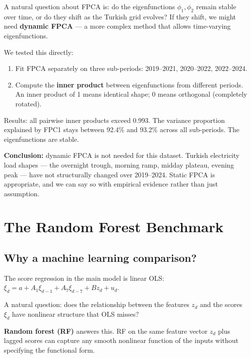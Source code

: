 \documentclass[11pt,a4paper]{article}
\begin{document}
A natural question about FPCA is: do the eigenfunctions $\phi_1, \phi_2$
remain stable over time, or do they shift as the Turkish grid evolves?
If they shift, we might need \textbf{dynamic FPCA} --- a more complex
method that allows time-varying eigenfunctions.

We tested this directly:

\begin{enumerate}[nosep]
  \item Fit FPCA separately on three sub-periods: 2019--2021, 2020--2022, 2022--2024.
  \item Compute the \textbf{inner product} between eigenfunctions from
    different periods. An inner product of 1 means identical shape;
    0 means orthogonal (completely rotated).
\end{enumerate}

Results: all pairwise inner products exceed 0.993. The variance
proportion explained by FPC1 stays between 92.4\% and 93.2\%
across all sub-periods. The eigenfunctions are stable.

\begin{resultbox}
\textbf{Conclusion:} dynamic FPCA is not needed for this dataset.
Turkish electricity load shapes --- the overnight trough, morning
ramp, midday plateau, evening peak --- have not structurally changed
over 2019--2024. Static FPCA is appropriate, and we can say so with
empirical evidence rather than just assumption.
\end{resultbox}

\section{The Random Forest Benchmark}

\subsection{Why a machine learning comparison?}

The score regression in the main model is linear OLS:
$\xi_d = a + A_1\xi_{d-1} + A_7\xi_{d-7} + Bz_d + u_d$.

A natural question: does the relationship between the features $z_d$
and the scores $\xi_d$ have nonlinear structure that OLS misses?

\textbf{Random forest (RF)} answers this. RF on the same feature
vector $z_d$ plus lagged scores can capture any smooth nonlinear
function of the inputs without specifying the functional form.
\end{document}
